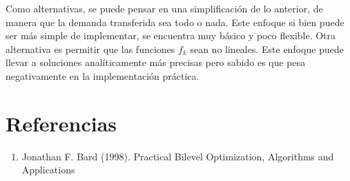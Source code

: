\documentclass{article}
\begin{document}
  Como alternativas, se puede pensar en una simplificación de lo anterior, de manera que la demanda transferida sea todo o nada. Este enfoque si bien puede ser más simple de implementar, se encuentra muy básico y poco flexible. Otra alternativa es permitir que las funciones $f_k$ sean no lineales. Este enfoque puede llevar a soluciones analíticamente más precisas pero sabido es que pesa negativamente en la implementación práctica.

  \section*{Referencias}

  \begin{enumerate}
    \item{\label{bardbook} Jonathan F. Bard (1998). Practical Bilevel Optimization, Algorithms and Applications}
  \end{enumerate}
\end{document}
